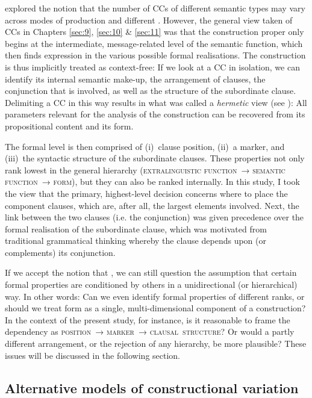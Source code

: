  explored the notion that the number of CCs of different semantic types may vary across modes of production and different . However, the general view taken of CCs in Chapters \ref{sec:9}, \ref{sec:10} \& \ref{sec:11} was that the construction proper only begins at the intermediate, message-related level of the semantic function, which then finds expression in the various possible formal realisations. The construction is thus implicitly treated as context-free: If we look at a CC in isolation, we can identify its internal semantic make-up, the arrangement of clauses, the conjunction that is involved, as well as the structure of the subordinate clause. Delimiting a CC in this way results in what was called a \textit{hermetic} view (see ): All parameters relevant for the analysis of the construction can be recovered from its propositional content and its form.

The formal level is then comprised of
(i)~clause position,
(ii)~a marker, and
(iii)~the syntactic structure of the subordinate clauses. These properties not only rank lowest in the general hierarchy (\textsc{extralinguistic function}~→ \textsc{semantic function}~→ \textsc{form}), but they can also be ranked internally. In this study, I took the view that the primary, highest-level decision concerns where to place the component clauses, which are, after all, the largest elements involved. Next, the link between the two clauses (i.e. the conjunction) was given precedence over the formal realisation of the subordinate clause, which was motivated from traditional grammatical thinking whereby the clause depends upon (or complements) its conjunction.

If we accept the notion that , we can still question the assumption that certain formal properties are conditioned by others in a unidirectional (or hierarchical) way. In other words: Can we even identify formal properties of different ranks, or should we treat form as a single, multi-dimensional component of a construction? In the context of the present study, for instance, is it reasonable to frame the dependency as \textsc{position}~→ \textsc{marker}~→ \textsc{clausal~structure}? Or would a partly different arrangement, or the rejection of any hierarchy, be more plausible? These issues will be discussed in the following section.

\subsection{\label{bkm:Ref80788003}Alternative models of constructional variation}\label{sec:12.3.2}

